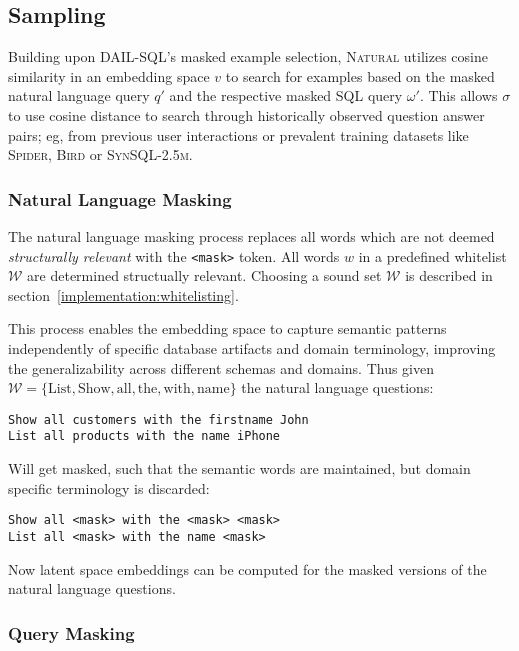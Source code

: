\subsection{Sampling}\label{design:sampling}

Building upon DAIL-SQL's masked example selection, \textsc{Natural} utilizes 
cosine similarity in an embedding space $v$ to search for examples based on the
masked natural language query $q'$ and the respective masked SQL query $\omega'$.
This allows $\sigma$ to use cosine distance to search through historically observed
question answer pairs; eg, from previous user interactions or prevalent training
datasets like \textsc{Spider}, \textsc{Bird} or \textsc{SynSQL-2.5m}.

\subsubsection{Natural Language Masking}

The natural language masking process replaces all words which are not deemed
\textit{structurally relevant} with the \texttt{<mask>} token. All words $w$
in a predefined whitelist $\mathcal{W}$ are determined structually relevant.
Choosing a sound set $\mathcal{W}$ is described in section~\ref{implementation:whitelisting}.

This process enables the embedding space to capture semantic patterns independently
of specific database artifacts and domain terminology, improving the generalizability
across different schemas and domains. Thus given $\mathcal{W} = \{\text{List},
\text{Show}, \text{all}, \text{the}, \text{with}, \text{name}\}$ the natural language
questions:

\begin{verbatim}
Show all customers with the firstname John
List all products with the name iPhone
\end{verbatim}

Will get masked, such that the semantic words are maintained, but domain specific
terminology is discarded:

\begin{verbatim}
Show all <mask> with the <mask> <mask>
List all <mask> with the name <mask>
\end{verbatim}

Now latent space embeddings can be computed for the masked versions of the natural
language questions.

\subsubsection{Query Masking}

